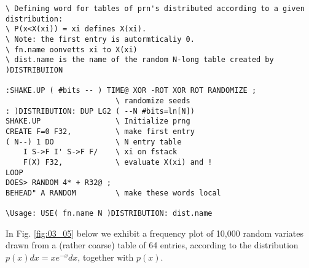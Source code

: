\begin{verbatim}
\ Defining word for tables of prn's distributed according to a given distribution:
\ P(x<X(xi)) = xi defines X(xi).
\ Note: the first entry is autormticaliy 0.  
\ fn.name oonvetts xi to X(xi) 
\ dist.name is the name of the random N-long table created by )DISTRIBUIION

:SHAKE.UP ( #bits -- ) TIME@ XOR -ROT XOR ROT RANDOMIZE ;
                         \ randomize seeds
: )DISTRIBUTION: DUP LG2 ( --N #bits=ln[N])
SHAKE.UP                 \ Initialize prng
CREATE F=0 F32,          \ make first entry
( N--) 1 DO              \ N entry table
    I S->F I' S->F F/    \ xi on fstack
    F(X) F32,            \ evaluate X(xi) and !
LOOP
DOES> RANDOM 4* + R32@ ;
BEHEAD" A RANDOM         \ make these words local

\Usage: USE( fn.name N )DISTRIBUTION: dist.name
\end{verbatim}
In Fig. \ref{fig:03_05} below we exhibit a frequency plot of 10,000 random
variates drawn from a (rather coarse) table of 64 entries, according to the
distribution $p(x)dx=xe^{-x}dx$, together with $p(x)$.
